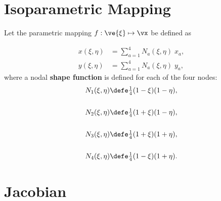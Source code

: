 \documentclass[14pt,letterpaper,fleqn]{extreport}
\begin{document}
\clearpage

\section{Isoparametric Mapping}
Let the parametric mapping $f: \ve{\xi} \mapsto \vx$ be defined as

\begin{align}
  x(\xi,\eta) & = \sum_{a=1}^4 N_a(\xi, \eta) \; x_a, \label{eq:shapex} \\
  y(\xi,\eta) & = \sum_{a=1}^4 N_a(\xi, \eta) \; y_a, \label{eq:shapey}
\end{align}
where a nodal {\bf shape function} is defined for each of the four nodes:
\begin{align}
  N_1(\xi, \eta) & \defe \tfrac{1}{4} (1 - \xi) (1 - \eta), \\
  & \nonumber \\
  N_2(\xi, \eta) & \defe \tfrac{1}{4} (1 + \xi) (1 - \eta), \\
  & \nonumber \\
  N_3(\xi, \eta) & \defe \tfrac{1}{4} (1 + \xi) (1 + \eta), \\
  & \nonumber \\
  N_4(\xi, \eta) & \defe \tfrac{1}{4} (1 - \xi) (1 + \eta).
\end{align}

\clearpage

\section{Jacobian}
\end{document}
